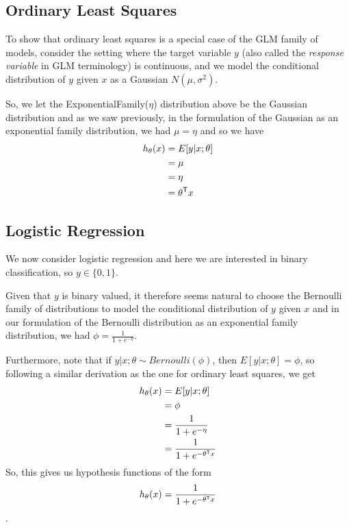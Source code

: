 \subsection{Ordinary Least Squares}
To show that ordinary least squares is a special case of the GLM family of models, consider the setting 
where the target variable $y$ (also called the \emph{response variable} in GLM terminology) is continuous,
and we model the conditional distribution of $y$ given $x$ as a Gaussian $N(\mu, \sigma^2)$.

So, we let the ExponentialFamily($\eta$) distribution above be the Gaussian distribution and 
as we saw previously, in the formulation of the Gaussian as an exponential family distribution,
we had $\mu = \eta$ and so we have
\begin{align*}
    h_{\theta}(x) & = E[y | x; \theta] \\
                  & = \mu \\
                  & = \eta \\
                  & = \theta ^ \mathsf{T} x \\
\end{align*}

\subsection{Logistic Regression}
We now consider logistic regression and here we are interested in binary classification, so $y \in \{0,1\}$.

Given that $y$ is binary valued, it therefore seems natural to choose the Bernoulli family of distributions
to model the conditional distribution of $y$ given $x$ and in our formulation of the Bernoulli distribution as
an exponential family distribution, we had $\phi = \frac{1}{1 + e ^{-\eta}}$.

Furthermore, note that if $y | x; \theta \sim Bernoulli(\phi)$, then $E[y | x; \theta] = \phi$, so following
a similar derivation as the one for ordinary least squares, we get
\begin{align*}
    h_{\theta}(x) & = E[y | x; \theta] \\
                  & = \phi \\
                  & = \frac{1}{1 + e ^ {-\eta}} \\
                  & = \frac{1}{1 + e ^ {-\theta ^ \mathsf{T} x}} \\
\end{align*}
So, this gives us hypothesis functions of the form 
\[ h_{\theta}(x) = \frac{1}{1 + e^{-\theta ^ \mathsf{T} x}} \].

